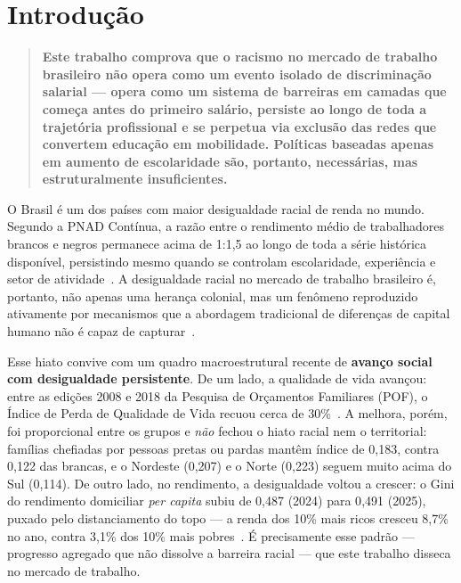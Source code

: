 \documentclass[12pt, a4paper, oneside]{article}
\begin{document}
\newpage
\tableofcontents
\newpage

\section{Introdução}
\label{sec:intro}

\begin{quote}
\textbf{Este trabalho comprova que o racismo no mercado de trabalho brasileiro
não opera como um evento isolado de discriminação salarial --- opera como
um sistema de barreiras em camadas que começa antes do primeiro salário,
persiste ao longo de toda a trajetória profissional e se perpetua via
exclusão das redes que convertem educação em mobilidade.
Políticas baseadas apenas em aumento de escolaridade são, portanto,
necessárias, mas estruturalmente insuficientes.}
\end{quote}

O Brasil é um dos países com maior desigualdade racial de renda no mundo.
Segundo a PNAD Contínua, a razão entre o rendimento médio de trabalhadores
brancos e negros permanece acima de 1{:}1,5 ao longo de toda a série
histórica disponível, persistindo mesmo quando se controlam escolaridade,
experiência e setor de atividade~\cite{ibge_pnad_2023}.
A desigualdade racial no mercado de trabalho brasileiro é, portanto,
não apenas uma herança colonial, mas um fenômeno reproduzido ativamente
por mecanismos que a abordagem tradicional de diferenças de capital humano
não é capaz de capturar~\cite{hasenbalg1979}.

Esse hiato convive com um quadro macroestrutural recente de \textbf{avanço social
com desigualdade persistente}. De um lado, a qualidade de vida avançou: entre as
edições 2008 e 2018 da Pesquisa de Orçamentos Familiares (POF), o Índice de Perda
de Qualidade de Vida recuou cerca de 30\%~\cite{ibge_pof_2019}. A melhora, porém,
foi proporcional entre os grupos e \emph{não} fechou o hiato racial nem o
territorial: famílias chefiadas por pessoas pretas ou pardas mantêm índice de
0{,}183, contra 0{,}122 das brancas, e o Nordeste (0{,}207) e o Norte
(0{,}223) seguem muito acima do Sul (0{,}114). De outro lado, no rendimento, a
desigualdade voltou a crescer: o Gini do rendimento domiciliar \emph{per capita}
subiu de 0{,}487 (2024) para 0{,}491 (2025), puxado pelo distanciamento do topo
--- a renda dos 10\% mais ricos cresceu 8{,}7\% no ano, contra 3{,}1\% dos 10\%
mais pobres~\cite{ibge_rendimentos_2025}. É precisamente esse padrão --- progresso
agregado que não dissolve a barreira racial --- que este trabalho disseca no
mercado de trabalho.
\end{document}
